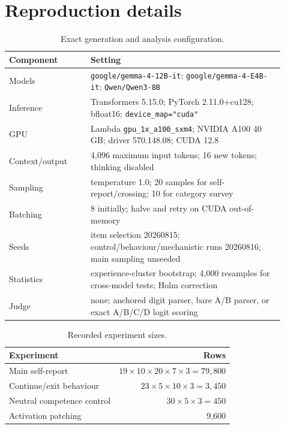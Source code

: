\appendix

\section{Reproduction details}

\begin{table}[h]
\centering
\caption{Exact generation and analysis configuration.}
\small
\begin{tabular}{p{0.27\linewidth}p{0.64\linewidth}}
\toprule
Component & Setting\\
\midrule
Models & \texttt{google/gemma-4-12B-it}; \texttt{google/gemma-4-E4B-it}; \texttt{Qwen/Qwen3-8B}\\
Inference & Transformers 5.15.0; PyTorch 2.11.0+cu128; bfloat16; \texttt{device\_map="cuda"}\\
GPU & Lambda \texttt{gpu\_1x\_a100\_sxm4}; NVIDIA A100 40 GB; driver 570.148.08; CUDA 12.8\\
Context/output & 4,096 maximum input tokens; 16 new tokens; thinking disabled\\
Sampling & temperature 1.0; 20 samples for self-report/crossing; 10 for category survey\\
Batching & 8 initially; halve and retry on CUDA out-of-memory\\
Seeds & item selection 20260815; control/behaviour/mechanistic runs 20260816; main sampling unseeded\\
Statistics & experience-cluster bootstrap; 4,000 resamples for cross-model tests; Holm correction\\
Judge & none; anchored digit parser, bare A/B parser, or exact A/B/C/D logit scoring\\
\bottomrule
\end{tabular}
\end{table}

\begin{table}[h]
\centering
\caption{Recorded experiment sizes.}
\small
\begin{tabular}{lr}
\toprule
Experiment & Rows\\
\midrule
Main self-report & $19\times10\times20\times7\times3=79{,}800$\\
Continue/exit behaviour & $23\times5\times10\times3=3{,}450$\\
Neutral competence control & $30\times5\times3=450$\\
Activation patching & 9,600\\
\bottomrule
\end{tabular}
\end{table}

